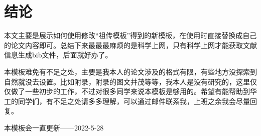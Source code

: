\chapter{结\texorpdfstring{\quad}{}论}
本文主要是展示如何使用修改“祖传模板”得到的新模板，在使用时直接替换成自己的论文内容即可。总结下来最最最麻烦的是科学上网，只有科学上网才能获取文献信息生成bib文件，后面就好办了。

本模板难免有不足之处，主要是我本人的论文涉及的格式有限，有些地方没探索到自然就没去设置。比如附录，附录的图文并茂等等，我本人是没有研究的，这里仅仅做了一些初步的工作，不过对很多同学来说本模板是够用的。希望有能帮助到华工的同学们，有不足之处请多多理解，可以通过邮件联系我，上班之余我会尽量回复。

本模板会一直更新——2022-5-28